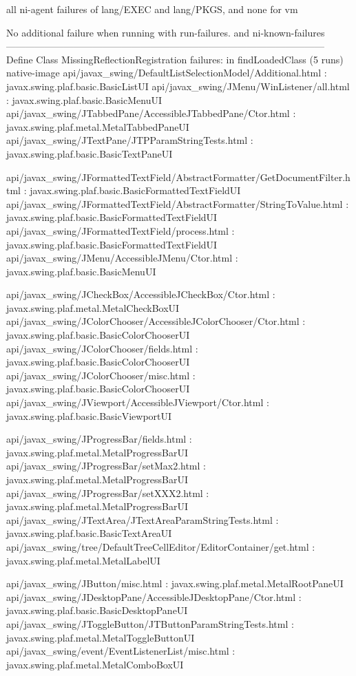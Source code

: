 all ni-agent failures of lang/EXEC and lang/PKGS, and none for vm

No additional failure when running with run-failures. and ni-known-failures
---------------------------------------------------------------------------------------------------
Define Class MissingReflectionRegistration failures: in findLoadedClass (5 runs)
native-image api/javax_swing/DefaultListSelectionModel/Additional.html : javax.swing.plaf.basic.BasicListUI
api/javax_swing/JMenu/WinListener/all.html : javax.swing.plaf.basic.BasicMenuUI
api/javax_swing/JTabbedPane/AccessibleJTabbedPane/Ctor.html : javax.swing.plaf.metal.MetalTabbedPaneUI
api/javax_swing/JTextPane/JTPParamStringTests.html : javax.swing.plaf.basic.BasicTextPaneUI

api/javax_swing/JFormattedTextField/AbstractFormatter/GetDocumentFilter.html : javax.swing.plaf.basic.BasicFormattedTextFieldUI
api/javax_swing/JFormattedTextField/AbstractFormatter/StringToValue.html : javax.swing.plaf.basic.BasicFormattedTextFieldUI
api/javax_swing/JFormattedTextField/process.html : javax.swing.plaf.basic.BasicFormattedTextFieldUI
api/javax_swing/JMenu/AccessibleJMenu/Ctor.html : javax.swing.plaf.basic.BasicMenuUI

api/javax_swing/JCheckBox/AccessibleJCheckBox/Ctor.html : javax.swing.plaf.metal.MetalCheckBoxUI
api/javax_swing/JColorChooser/AccessibleJColorChooser/Ctor.html : javax.swing.plaf.basic.BasicColorChooserUI
api/javax_swing/JColorChooser/fields.html : javax.swing.plaf.basic.BasicColorChooserUI
api/javax_swing/JColorChooser/misc.html : javax.swing.plaf.basic.BasicColorChooserUI
api/javax_swing/JViewport/AccessibleJViewport/Ctor.html : javax.swing.plaf.basic.BasicViewportUI

api/javax_swing/JProgressBar/fields.html : javax.swing.plaf.metal.MetalProgressBarUI
api/javax_swing/JProgressBar/setMax2.html : javax.swing.plaf.metal.MetalProgressBarUI
api/javax_swing/JProgressBar/setXXX2.html : javax.swing.plaf.metal.MetalProgressBarUI
api/javax_swing/JTextArea/JTextAreaParamStringTests.html : javax.swing.plaf.basic.BasicTextAreaUI
api/javax_swing/tree/DefaultTreeCellEditor/EditorContainer/get.html : javax.swing.plaf.metal.MetalLabelUI

api/javax_swing/JButton/misc.html : javax.swing.plaf.metal.MetalRootPaneUI
api/javax_swing/JDesktopPane/AccessibleJDesktopPane/Ctor.html : javax.swing.plaf.basic.BasicDesktopPaneUI
api/javax_swing/JToggleButton/JTButtonParamStringTests.html : javax.swing.plaf.metal.MetalToggleButtonUI
api/javax_swing/event/EventListenerList/misc.html : javax.swing.plaf.metal.MetalComboBoxUI


